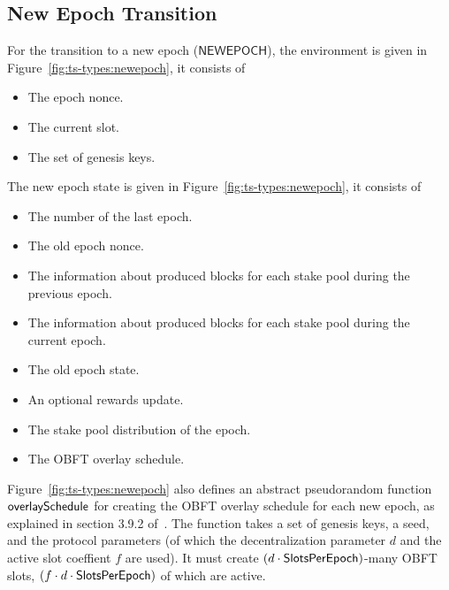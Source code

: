 \clearpage

\subsection{New Epoch Transition}
\label{sec:new-epoch-trans}

For the transition to a new epoch ($\mathsf{NEWEPOCH}$), the environment is
given in Figure~\ref{fig:ts-types:newepoch}, it consists of

\begin{itemize}
\item The epoch nonce.
\item The current slot.
\item The set of genesis keys.
\end{itemize}
The new epoch state is given in Figure~\ref{fig:ts-types:newepoch}, it consists
of

\begin{itemize}
\item The number of the last epoch.
\item The old epoch nonce.
\item The information about produced blocks for each stake pool during the previous epoch.
\item The information about produced blocks for each stake pool during the current epoch.
\item The old epoch state.
\item An optional rewards update.
\item The stake pool distribution of the epoch.
\item The OBFT overlay schedule.
\end{itemize}

Figure~\ref{fig:ts-types:newepoch} also defines an abstract pseudorandom function
$\mathsf{overlaySchedule}$ for creating the OBFT overlay schedule for each new epoch,
as explained in section 3.9.2 of~\cite{delegation_design}.
The function takes a set of genesis keys, a seed, and the protocol parameters
(of which the decentralization parameter $d$ and the active slot coeffient $f$ are used).
It must create $(d\cdot\mathsf{SlotsPerEpoch})$-many OBFT slots, $(f\cdot d\cdot \mathsf{SlotsPerEpoch})$
of which are active.

